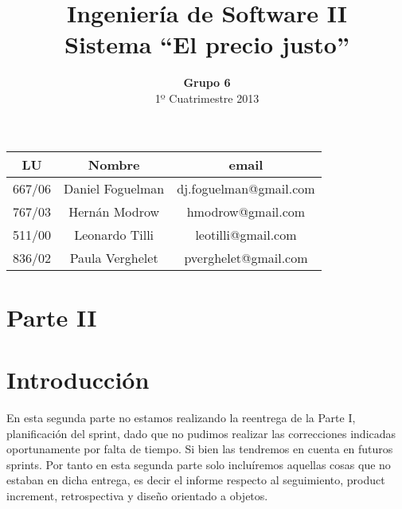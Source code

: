 \documentclass[a4paper,8pt]{article}
\title{Ingeniería de Software II\\ \textbf{Sistema ``El precio justo''}}
\author{\textbf{Grupo 6}\\ 1º Cuatrimestre 2013}
\date{}
\begin{document}
\maketitle
\vspace{10cm}
\begin{center}

\begin{tabular}{|c|c|c|}
\hline
\hline
\textbf{LU}&\textbf{Nombre}&\textbf{email}\\
\hline
667/06&Daniel Foguelman &dj.foguelman@gmail.com\\
\hline
767/03&Hernán Modrow&hmodrow@gmail.com\\
\hline
511/00&Leonardo Tilli&leotilli@gmail.com\\
\hline
836/02&Paula Verghelet&pverghelet@gmail.com\\
\hline
\hline
\end{tabular}
\end{center}
\newpage

\section{Parte II}

\section{Introducción}

En esta segunda parte no estamos realizando la reentrega de la Parte I, planificación del sprint, dado que no pudimos realizar las correcciones indicadas oportunamente por falta de tiempo. Si bien las tendremos en cuenta en futuros sprints. 
Por tanto en esta segunda parte solo incluíremos aquellas cosas que no estaban en dicha entrega, es decir el informe respecto al seguimiento, product increment, retrospectiva y diseño orientado a objetos. 





\end{document}
